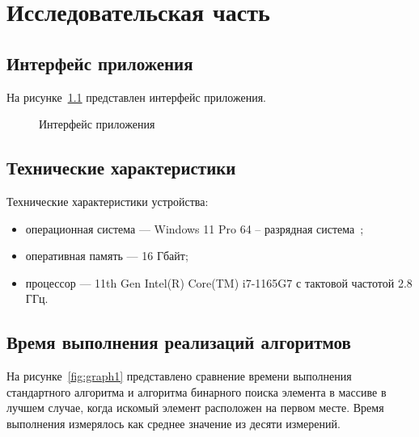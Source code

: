\chapter{Исследовательская часть}

\section{Интерфейс приложения}

На рисунке~\ref{fig:interface} представлен интерфейс приложения.

\begin{figure}[h!]
	\caption{Интерфейс приложения}
	\label{fig:interface}
\end{figure}

\section{Технические характеристики}

Технические характеристики устройства:

\begin{itemize}
	\item операционная система --- Windows 11 Pro 64 -- разрядная система~\cite{windows};
	\item оперативная память --- 16 Гбайт;
	\item процессор --- 11th Gen Intel(R) Core(TM) i7-1165G7 с тактовой частотой 2.8 ГГц.
\end{itemize}

\section{Время выполнения реализаций алгоритмов}

На рисунке~\ref{fig:graph1} представлено сравнение времени выполнения стандартного алгоритма и алгоритма бинарного поиска элемента в массиве в лучшем случае, когда искомый элемент расположен на первом месте.
Время выполнения измерялось как среднее значение из десяти измерений.

